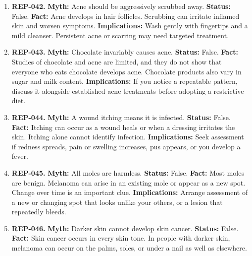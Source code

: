 \documentclass[11pt,oneside]{book}
\begin{document}
\begin{enumerate}[leftmargin=0pt,labelwidth=0pt,labelsep=0pt,itemindent=0pt]
\item[] \textbf{REP-042.} \textbf{Myth:} Acne should be aggressively scrubbed away.\newline
\textbf{Status:} False.\newline
\textbf{Fact:} Acne develops in hair follicles. Scrubbing can irritate inflamed skin and worsen symptoms. \cite{ref313}\newline
\textbf{Implications:} Wash gently with fingertips and a mild cleanser. Persistent acne or scarring may need targeted treatment.
\item[] \textbf{REP-043.} \textbf{Myth:} Chocolate invariably causes acne.\newline
\textbf{Status:} False.\newline
\textbf{Fact:} Studies of chocolate and acne are limited, and they do not show that everyone who eats chocolate develops acne. Chocolate products also vary in sugar and milk content. \cite{ref265}\newline
\textbf{Implications:} If you notice a repeatable pattern, discuss it alongside established acne treatments before adopting a restrictive diet.
\item[] \textbf{REP-044.} \textbf{Myth:} A wound itching means it is infected.\newline
\textbf{Status:} False.\newline
\textbf{Fact:} Itching can occur as a wound heals or when a dressing irritates the skin. Itching alone cannot identify infection. \cite{ref198}\newline
\textbf{Implications:} Seek assessment if redness spreads, pain or swelling increases, pus appears, or you develop a fever.
\item[] \textbf{REP-045.} \textbf{Myth:} All moles are harmless.\newline
\textbf{Status:} False.\newline
\textbf{Fact:} Most moles are benign. Melanoma can arise in an existing mole or appear as a new spot. Change over time is an important clue. \cite{ref339}\newline
\textbf{Implications:} Arrange assessment of a new or changing spot that looks unlike your others, or a lesion that repeatedly bleeds.
\item[] \textbf{REP-046.} \textbf{Myth:} Darker skin cannot develop skin cancer.\newline
\textbf{Status:} False.\newline
\textbf{Fact:} Skin cancer occurs in every skin tone. In people with darker skin, melanoma can occur on the palms, soles, or under a nail as well as elsewhere. \cite{ref340}\newline

\end{enumerate}
\end{document}
